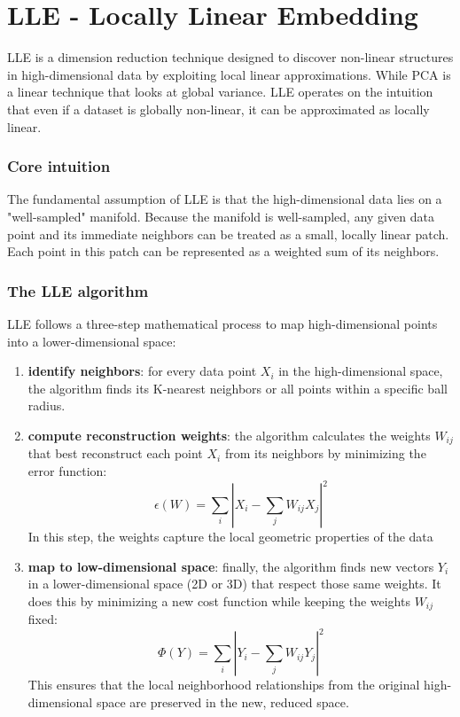 \section{LLE - Locally Linear Embedding}
LLE is a dimension reduction technique designed to discover non-linear structures in high-dimensional data by exploiting local linear approximations. While PCA is a linear technique that looks at global variance. LLE operates on the intuition that even if a dataset is globally non-linear, it can be approximated as locally linear.

\subsubsection{Core intuition}
The fundamental assumption of LLE is that the high-dimensional data lies on a "well-sampled" manifold. Because the manifold is well-sampled, any given data point and its immediate neighbors can be treated as a small, locally linear patch. Each point in this patch can be represented as a weighted sum of its neighbors.

\subsubsection{The LLE algorithm}
LLE follows a three-step mathematical process to map high-dimensional points into a lower-dimensional space:
\begin{enumerate}[noitemsep]
    \item \textbf{identify neighbors}: for every data point \(X_i\) in the high-dimensional space, the algorithm finds its K-nearest neighbors or all points within a specific ball radius.
    \item \textbf{compute reconstruction weights}: the algorithm calculates the weights \(W_{ij}\) that best reconstruct each point \(X_i\) from its neighbors by minimizing the error function: 
    \begin{equation}
        \label{eq:9.3}
        \epsilon(W) = \sum_i | X_i - \sum_j W_{ij} X_j|^2
    \end{equation}
    In this step, the weights capture the local geometric properties of the data
    \item \textbf{map to low-dimensional space}: finally, the algorithm finds new vectors \(Y_i\) in a lower-dimensional space (2D or 3D) that respect those same weights. It does this by minimizing a new cost function while keeping the weights \(W_{ij}\) fixed:
    \begin{equation}
        \label{eq:9.4}
        \Phi(Y) = \sum_i |Y_i - \sum_j W_{ij}Y_j|^2
    \end{equation}
    This ensures that the local neighborhood relationships from the original high-dimensional space are preserved in the new, reduced space.
\end{enumerate}

